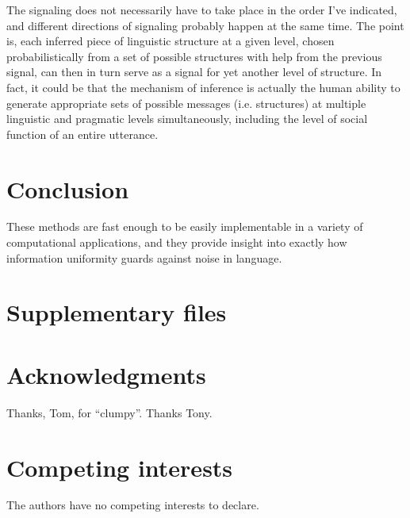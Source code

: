 \documentclass[12pt]{article}
\begin{document}
The signaling does not necessarily have to take place in the order I've indicated, and different directions of signaling probably happen at the same time. The point is, each inferred piece of linguistic structure at a given level, chosen probabilistically from a set of possible structures with help from the previous signal, can then in turn serve as a signal for yet another level of structure. In fact, it could be that the mechanism of inference is actually the human ability to generate appropriate sets of possible messages (i.e. structures) at multiple linguistic and pragmatic levels simultaneously, including the level of social function of an entire utterance. 

\section{Conclusion}

These methods are fast enough to be easily implementable in a variety of computational applications, and they provide insight into exactly how information uniformity guards against noise in language.

\section*{Supplementary files}

\section*{Acknowledgments}

Thanks, Tom, for ``clumpy''. Thanks Tony.

\section*{Competing interests}

The authors have no competing interests to declare.




\end{document}
